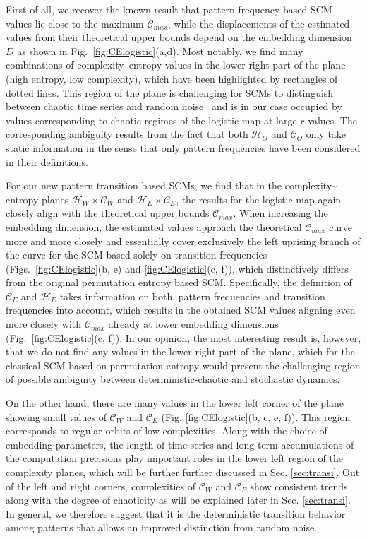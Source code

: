 \documentclass[aip,cha,reprint,nofootinbib]{revtex4-1}
\begin{document}
First of all, we recover the known result that pattern frequency based SCM values lie close to the maximum $\mathcal{C}_{max}$, while the displacements of the estimated values from their theoretical upper bounds depend on the embedding dimension $D$ as shown in Fig.~\ref{fig:CElogistic}(a,d). Most notably, we find many combinations of complexity--entropy values in the lower right part of the plane (high entropy, low complexity), which have been highlighted by rectangles of dotted lines. This region of the plane is challenging for SCMs to distinguish between chaotic time series and random noise~\cite{BorgesAMC2019} and is in our case occupied by values corresponding to chaotic regimes of the logistic map at large $r$ values. The corresponding ambiguity results from the fact that both $\mathcal{H}_O$ and $\mathcal{C}_O$ only take static information in the sense that only pattern frequencies have been considered in their definitions. 

For our new pattern transition based SCMs, we find that in the complexity--entropy planes $\mathcal{H}_W \times \mathcal{C}_W$ and $\mathcal{H}_E \times \mathcal{C}_E$, the results for the logistic map again closely align with the theoretical upper bounds $\mathcal{C}_{max}$. When increasing the embedding dimension, the estimated values approach the theoretical $\mathcal{C}_{max}$ curve more and more closely and essentially cover exclusively the left uprising branch of the curve for the SCM based solely on transition frequencies (Figs.~\ref{fig:CElogistic}(b, e) and \ref{fig:CElogistic}(c, f)), which distinctively differs from the original permutation entropy based SCM. Specifically, the definition of $\mathcal{C}_{E}$ and $\mathcal{H}_{E}$ takes information on both, pattern frequencies and transition frequencies into account, which results in the obtained SCM values aligning even more closely with $\mathcal{C}_{max}$ already at lower embedding dimensions (Fig.~\ref{fig:CElogistic}(c, f)). In our opinion, the most interesting result is, however, that we do not find any values in the lower right part of the plane, which for the classical SCM based on permutation entropy would present the challenging region of possible ambiguity between deterministic-chaotic and stochastic dynamics. 

{\color{red}On the other hand, there are many values in the lower left corner of the plane showing small values of $\mathcal{C}_{W}$ and $\mathcal{C}_{E}$ (Fig. \ref{fig:CElogistic}(b, c, e, f)). This region corresponds to regular orbits of low complexities. Along with the choice of embedding parameters, the length of time series and long term accumulations of the computation precisions play important roles in the lower left region of the complexity planes, which will be further further discussed in Sec. \ref{sec:transi}. Out of the left and right corners, complexities of $\mathcal{C}_{W}$ and $\mathcal{C}_{E}$ show consistent trends along with the degree of chaoticity as will be explained later in Sec. \ref{sec:transi}.} In general, we therefore suggest that it is the deterministic transition behavior among patterns that allows an improved distinction from random noise. 
\end{document}
